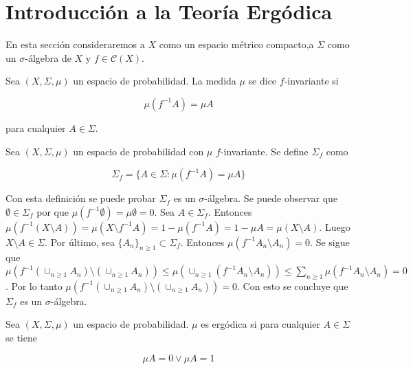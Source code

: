 \section{Introducción a la Teoría Ergódica}

En esta sección consideraremos a $X$ como un espacio métrico compacto,a $\Sigma$ como un $\sigma$-álgebra de $X$ y $f \in \mathcal{C}(X)$.

\begin{definicion}
	Sea $(X,\Sigma,\mu)$ un espacio de probabilidad. La medida $\mu$ se dice $f$-invariante si
	
	\begin{equation}
		\mu(f^{-1}A) = \mu A
	\end{equation}
	
	para cualquier $A \in \Sigma$.
\end{definicion}

\begin{definicion}
	Sea $(X,\Sigma,\mu)$ un espacio de probabilidad  con $\mu$ $f$-invariante. Se define $\Sigma_f$ como
	
	\begin{equation}
		\Sigma_f = \{ A \in \Sigma: \mu(f^{-1}A) = \mu A \}
	\end{equation}
\end{definicion}

Con esta definición se puede probar $\Sigma_f$ es un $\sigma$-álgebra. Se puede observar que $\emptyset \in \Sigma_f$ por que $\mu(f^{-1} \emptyset) = \mu \emptyset = 0$. Sea $A \in \Sigma_f$. Entonces $\mu(f^{-1}(X \setminus A)) =  \mu(X \setminus f^{-1}A) = 1 - \mu(f^{-1}A) = 1 - \mu A = \mu(X \setminus A)$. Luego $X \setminus A \in \Sigma$. Por último, sea $\{A_n\}_{n \geq 1} \subset \Sigma_f$. Entonces $\mu(f^{-1}A_n \setminus A_n) = 0$. Se sigue que $\mu(f^{-1}(\cup_{n \geq 1} A_n) \setminus (\cup_{n \geq 1} A_n)) \leq \mu(\cup_{n \geq 1} (f^{-1}A_n \setminus A_n)) \leq \sum_{n \geq 1} \mu(f^{-1}A_n \setminus A_n) = 0$. Por lo tanto $\mu(f^{-1}(\cup_{n \geq 1} A_n) \setminus (\cup_{n \geq 1} A_n)) = 0$. Con esto se concluye que $\Sigma_f$ es un $\sigma$-álgebra. 

\begin{definicion}
	Sea $(X,\Sigma,\mu)$ un espacio de probabilidad. $\mu$ es ergódica si para cualquier $A \in \Sigma$ se tiene
	
	\begin{equation}
		\mu A = 0 \vee \mu A = 1
	\end{equation}
\end{definicion}

